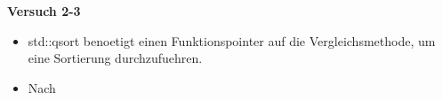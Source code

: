 \documentclass[german,10pt,oneside, fleqn, a4paper]{article}
\begin{document}
{\bf Versuch 2-3} \\[2ex]
\begin{itemize}
	\item std::qsort benoetigt einen Funktionspointer auf die Vergleichsmethode, um eine Sortierung durchzufuehren.
	\item Nach
\end{itemize}
\end{document}
